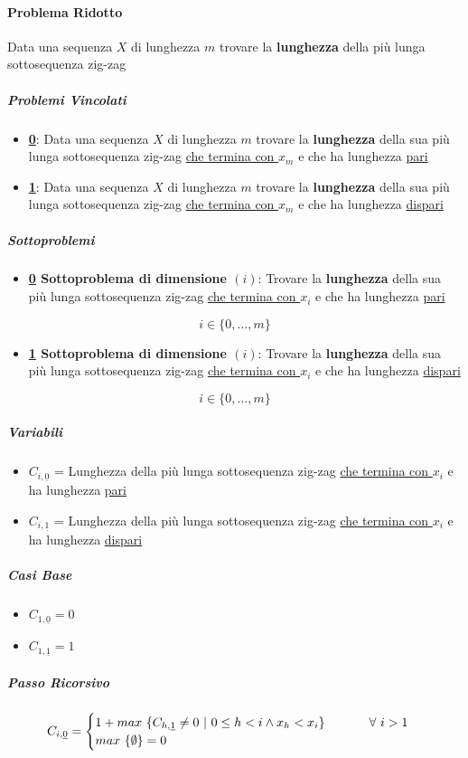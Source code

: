 \documentclass[12pt]{article}
\begin{document}
\paragraph{Problema Ridotto}
Data una sequenza $X$ di lunghezza $m$ trovare la \textbf{lunghezza} della più lunga sottosequenza zig-zag
\subparagraph{Problemi Vincolati}
\begin{itemize}
    \item \underline{\textbf{0}}: Data una sequenza $X$ di lunghezza $m$ trovare la \textbf{lunghezza} della sua più lunga sottosequenza zig-zag \underline{che termina con $x_m$} e che ha lunghezza \underline{pari}
    \item \underline{\textbf{1}}: Data una sequenza $X$ di lunghezza $m$ trovare la \textbf{lunghezza} della sua più lunga sottosequenza zig-zag \underline{che termina con $x_m$} e che ha lunghezza \underline{dispari}
\end{itemize}
\subparagraph{Sottoproblemi}
\begin{itemize}
    \item \textbf{\underline{0} Sottoproblema di dimensione $(i)$}: Trovare la \textbf{lunghezza} della sua più lunga sottosequenza zig-zag \underline{che termina con $x_i$} e che ha lunghezza \underline{pari}
\end{itemize}
$$i \in \{0, \dots, m\}$$
\begin{itemize}
    \item \textbf{\underline{1} Sottoproblema di dimensione $(i)$}: Trovare la \textbf{lunghezza} della sua più lunga sottosequenza zig-zag \underline{che termina con $x_i$} e che ha lunghezza \underline{dispari}
\end{itemize}
$$i \in \{0, \dots, m\}$$
\subparagraph{Variabili}
\begin{itemize}
    \item $C_{i,\underline{0}}$ = Lunghezza della più lunga sottosequenza zig-zag \underline{che termina con $x_i$} e ha lunghezza \underline{pari}
    \item $C_{i,\underline{1}}$ = Lunghezza della più lunga sottosequenza zig-zag \underline{che termina con $x_i$} e ha lunghezza \underline{dispari}
\end{itemize}
\newpage
\subparagraph{Casi Base}
\begin{itemize}
    \item $C_{1,\underline{0}} = 0$
    \item $C_{1,\underline{1}} = 1$
\end{itemize}
\subparagraph{Passo Ricorsivo}
\[
    C_{i, \underline{0}}=\begin{cases}
        1 + max \ \{C_{h, \underline{1}}\neq 0 \ | \ 0\leq h<i \land x_h<x_i\}$ \hspace{1cm} $\forall \ i>1 \\
        max \ \{\emptyset\} = 0
    \end{cases}
\]
\end{document}
